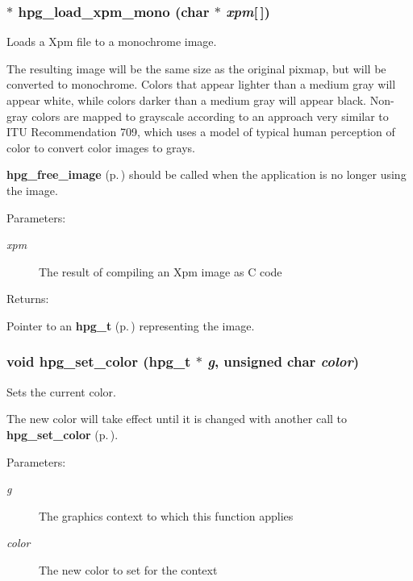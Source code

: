 \subsubsection{$\ast$ hpg\_\-load\_\-xpm\_\-mono (char $\ast$ {\em xpm}[$\,$])}\label{hpgraphics_8h_a80}


Loads a Xpm file to a monochrome image.

The resulting image will be the same size as the original pixmap, but will be converted to monochrome. Colors that appear lighter than a medium gray will appear white, while colors darker than a medium gray will appear black. Non-gray colors are mapped to grayscale according to an approach very similar to ITU Recommendation 709, which uses a model of typical human perception of color to convert color images to grays.

{\bf hpg\_\-free\_\-image} {\rm (p.\,\pageref{hpgraphics_8h_a78})} should be called when the application is no longer using the image.\begin{Desc}
\item[Parameters: ]\par
\begin{description}
\item[{\em 
xpm}]The result of compiling an Xpm image as C code \end{description}
\end{Desc}
\begin{Desc}
\item[Returns: ]\par
Pointer to an {\bf hpg\_\-t} {\rm (p.\,\pageref{hpgraphics_8h_a24})} representing the image. \end{Desc}
\subsubsection{\setlength{\rightskip}{0pt plus 5cm}void hpg\_\-set\_\-color ({\bf hpg\_\-t} $\ast$ {\em g}, unsigned char {\em color})}\label{hpgraphics_8h_a63}


Sets the current color.

The new color will take effect until it is changed with another call to {\bf hpg\_\-set\_\-color} {\rm (p.\,\pageref{hpgraphics_8h_a63})}.\begin{Desc}
\item[Parameters: ]\par
\begin{description}
\item[{\em 
g}]The graphics context to which this function applies \item[{\em 
color}]The new color to set for the context \end{description}
\end{Desc}
